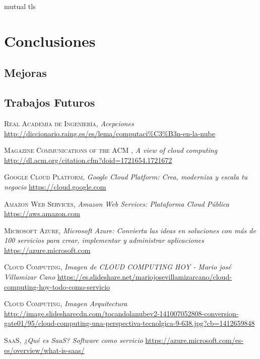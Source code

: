\documentclass[a4paper,11pt]{book}
\begin{document}
mutual tls

\chapter{Conclusiones}


\section{Mejoras}

\section{Trabajos Futuros}




\begin{thebibliography}{}

 \textsc{Real Academia de Ingeniería},
\textit{Acepciones}
\url{http://diccionario.raing.es/es/lema/computaci\%C3\%B3n-en-la-nube}


 \textsc{Magazine Communications of the ACM },
\textit{A view of cloud computing}
\url{http://dl.acm.org/citation.cfm?doid=1721654.1721672}

 \textsc{Google Cloud Platform},
\textit{Google Cloud Platform: Crea, moderniza y escala tu negocio}
\url{https://cloud.google.com}

 \textsc{Amazon Web Services},
\textit{Amazon Web Services: Plataforma Cloud Pública}
\url{https://aws.amazon.com}

 \textsc{Microsoft Azure},
\textit{Microsoft Azure: Convierta las ideas en soluciones con más de 100 servicios para crear, implementar y administrar aplicaciones}
\url{https://azure.microsoft.com}


 \textsc{Cloud Computing},
\textit{Imagen de CLOUD COMPUTING HOY - Mario josé Villamizar Cano}
\url{https://es.slideshare.net/mariojosevillamizarcano/cloud-computing-hoy-todo-como-servicio}

 \textsc{Cloud Computing},
\textit{Imagen Arquitectura}
\url{http://image.slidesharecdn.com/tocandolanubev2-141007052808-conversion-gate01/95/cloud-computing-una-perspectiva-tecnolgica-9-638.jpg?cb=1412659848}


 \textsc{SaaS},
\textit{¿Qué es SaaS? Software como servicio}
\url{https://azure.microsoft.com/es-es/overview/what-is-saas/} 


\end{thebibliography}
\end{document}
